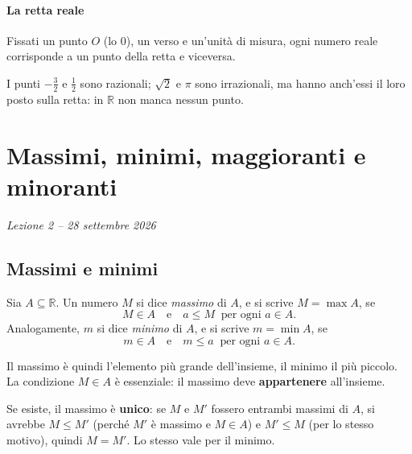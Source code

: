 \documentclass[11pt,a4paper]{article}
\begin{document}
\paragraph*{La retta reale}

Fissati un punto $O$ (lo $0$), un verso e un'unità di misura, ogni numero
reale corrisponde a un punto della retta e viceversa.

\begin{center}
\end{center}

I punti $-\frac32$ e $\frac12$ sono razionali; $\sqrt{2}$ e $\pi$ sono
irrazionali, ma hanno anch'essi il loro posto sulla retta: in $\mathbb{R}$
non manca nessun punto.

\section[Massimi, minimi, maggioranti e minoranti (Lezione 2 -- 28 settembre 2026)]{Massimi, minimi, maggioranti e minoranti}
\noindent\emph{Lezione 2 -- 28 settembre 2026}
\subsection{Massimi e minimi}

\begin{definizione}
Sia $A \subseteq \mathbb{R}$. Un numero $M$ si dice \emph{massimo} di $A$,
e si scrive $M = \max A$, se
\[
M \in A \quad \text{e} \quad a \leq M \ \text{ per ogni } a \in A.
\]
Analogamente, $m$ si dice \emph{minimo} di $A$, e si scrive $m = \min A$, se
\[
m \in A \quad \text{e} \quad m \leq a \ \text{ per ogni } a \in A.
\]
\end{definizione}

Il massimo è quindi l'elemento più grande dell'insieme, il minimo il più
piccolo. La condizione $M \in A$ è essenziale: il massimo deve
\textbf{appartenere} all'insieme.

Se esiste, il massimo è \textbf{unico}: se $M$ e $M'$ fossero entrambi
massimi di $A$, si avrebbe $M \leq M'$ (perché $M'$ è massimo e $M \in A$) e
$M' \leq M$ (per lo stesso motivo), quindi $M = M'$. Lo stesso vale per il
minimo.
\end{document}
